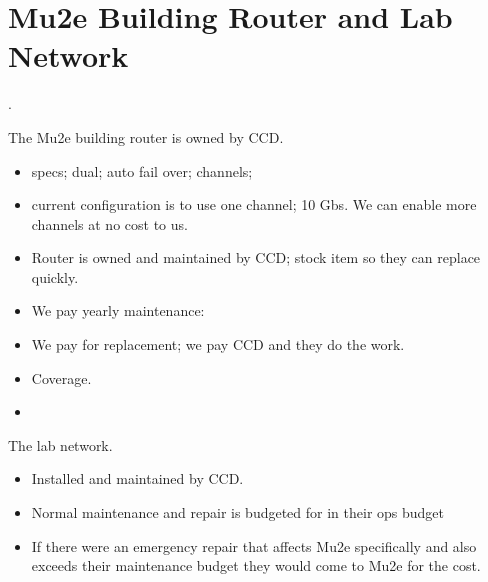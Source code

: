 \chapter{Mu2e Building Router and Lab Network}
\label{app:RouterAndNetwork}.

The Mu2e building router is owned by CCD.
\begin{itemize}
\item specs; dual; auto fail over; channels;
\item current configuration is to use one channel; 10 Gbs.  We can enable more channels at no cost to us.
\item Router is owned and maintained by CCD; stock item so they can replace quickly.
\item We pay yearly maintenance: 
\item We pay for replacement; we pay CCD and they do the work. 
\item {} Coverage.
\item {}
\end{itemize}


The lab network.
\begin{itemize}
\item Installed and maintained by CCD.
\item Normal maintenance and repair is budgeted for in their ops budget
\item If there were an emergency repair that affects Mu2e specifically and also exceeds their maintenance budget they would come to Mu2e for the cost.
\end{itemize}
